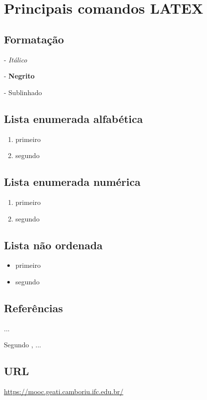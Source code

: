 \chapter{Principais comandos LATEX}

\section{Formatação}

- \textit{Itálico}

- \textbf{Negrito}

- Sublinhado

\section{Lista enumerada alfabética}

\begin{enumerate}[label=(\alph*)]
    \item primeiro
    \item segundo
\end{enumerate}

\section{Lista enumerada numérica}

\begin{enumerate}
    \item primeiro
    \item segundo
\end{enumerate}

\section{Lista não ordenada}

\begin{itemize}
    \item primeiro
    \item segundo
\end{itemize}
 
\section{Referências}

... \cite{FROZZA_2020}

Segundo , ...

\section{URL}
\url{https://mooc.geati.camboriu.ifc.edu.br/}


